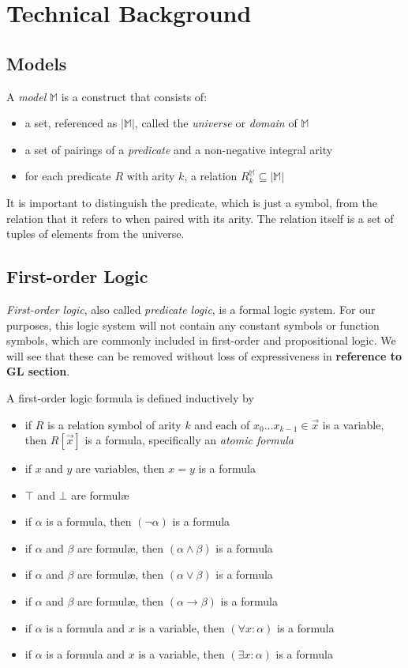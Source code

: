 \section{Technical Background}

	\subsection{Models}

		A \emph{model} $\mathbb{M}$ is a construct that consists of:
		\begin{itemize}
		\item a set, referenced as $|\mathbb{M}|$, called the \emph{universe} or \emph{domain} of $\mathbb{M}$
		\item a set of pairings of a \emph{predicate} and a non-negative integral arity
		\item for each predicate $R$ with arity $k$, a relation $R^\mathbb{M}_k \subseteq |\mathbb{M}|$
		\end{itemize}
		It is important to distinguish the predicate, which is just a symbol,
		from the relation that it refers to when paired with its arity. The
		relation itself is a set of tuples of elements from the universe.

	\subsection{First-order Logic}

		\emph{First-order logic}, also called \emph{predicate logic}, is a
		formal logic system. For our purposes, this logic system will not
		contain any constant symbols or function symbols, which are commonly
		included in first-order and propositional logic. We will see that these
		can be removed without loss of expressiveness in \textbf{reference to GL section}.

		A first-order logic formula is defined inductively by
		\begin{itemize}
		\item if $R$ is a relation symbol of arity $k$ and each of $x_0 \ldots x_{k-1} \in \vec{x}$ is a variable, then $R[\vec{x}]$ is a formula, specifically an \emph{atomic formula}
		\item if $x$ and $y$ are variables, then $x = y$ is a formula
		\item $\top$ and $\bot$ are formul{\ae}
		\item if $\alpha$ is a formula, then $(\neg\alpha)$ is a formula
		\item if $\alpha$ and $\beta$ are formul{\ae}, then $(\alpha \wedge \beta)$ is a formula
		\item if $\alpha$ and $\beta$ are formul{\ae}, then $(\alpha \vee \beta)$ is a formula
		\item if $\alpha$ and $\beta$ are formul{\ae}, then $(\alpha \to \beta)$ is a formula
		\item if $\alpha$ is a formula and $x$ is a variable, then $(\forall x : \alpha)$ is a formula
		\item if $\alpha$ is a formula and $x$ is a variable, then $(\exists x : \alpha)$ is a formula
		\end{itemize}


